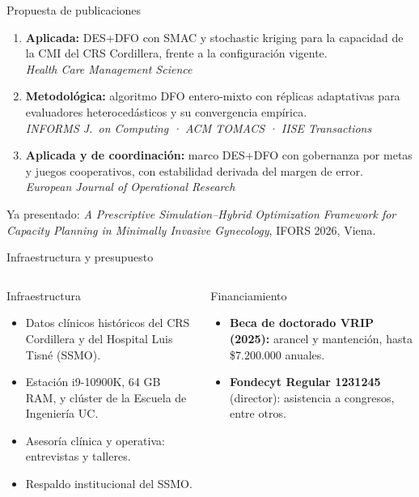 \documentclass[aspectratio=169,11pt,xcolor=table]{beamer}
\begin{document}
\begin{frame}{Propuesta de publicaciones}
  \begin{enumerate}
    \item \textbf{Aplicada:} DES+DFO con SMAC y stochastic kriging para la capacidad
      de la CMI del CRS Cordillera, frente a la configuración vigente.\\
      \hfill\textit{Health Care Management Science}
    \item \textbf{Metodológica:} algoritmo DFO entero-mixto con réplicas adaptativas
      para evaluadores heterocedásticos y su convergencia empírica.\\
      \hfill\textit{INFORMS J.\ on Computing · ACM TOMACS · IISE Transactions}
    \item \textbf{Aplicada y de coordinación:} marco DES+DFO con gobernanza por metas
      y juegos cooperativos, con estabilidad derivada del margen de error.\\
      \hfill\textit{European Journal of Operational Research}
  \end{enumerate}
  \vfill
  {\scriptsize Ya presentado: \textit{A Prescriptive Simulation--Hybrid Optimization Framework for
  Capacity Planning in Minimally Invasive Gynecology}, IFORS 2026, Viena.}
\end{frame}

\begin{frame}{Infraestructura y presupuesto}
  \begin{columns}[T]
      \begin{block}{Infraestructura}
        \begin{itemize}
          \item Datos clínicos históricos del CRS Cordillera y del Hospital Luis Tisné (SSMO).
          \item Estación i9-10900K, 64 GB RAM, y clúster de la Escuela de Ingeniería UC.
          \item Asesoría clínica y operativa: entrevistas y talleres.
          \item Respaldo institucional del SSMO.
        \end{itemize}
      \end{block}
      \begin{block}{Financiamiento}
        \begin{itemize}
          \item \textbf{Beca de doctorado VRIP (2025):} arancel y mantención, hasta \$7.200.000 anuales.
          \item \textbf{Fondecyt Regular 1231245} (director): asistencia a congresos, entre otros.
        \end{itemize}
      \end{block}
  \end{columns}
\end{frame}
\end{document}
